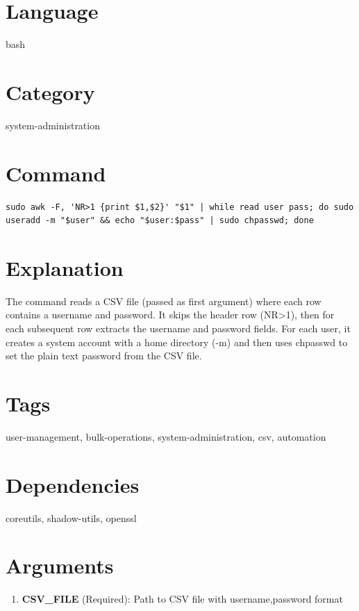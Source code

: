\documentclass[openany]{book}
\begin{document}
\section*{Language}
bash

\section*{Category}
system-administration

\section*{Command}
\begin{lstlisting}
sudo awk -F, 'NR>1 {print $1,$2}' "$1" | while read user pass; do sudo useradd -m "$user" && echo "$user:$pass" | sudo chpasswd; done
\end{lstlisting}

\section*{Explanation}
The command reads a CSV file (passed as first argument) where each row contains a username and password. It skips the header row (NR>1), then for each subsequent row extracts the username and password fields. For each user, it creates a system account with a home directory (-m) and then uses chpasswd to set the plain text password from the CSV file.

\section*{Tags}
user-management, bulk-operations, system-administration, csv, automation

\section*{Dependencies}
coreutils, shadow-utils, openssl


\section*{Arguments}
\begin{enumerate}
  \item \textbf{CSV\_FILE} (Required): Path to CSV file with username,password format
\end{enumerate}
\end{document}

